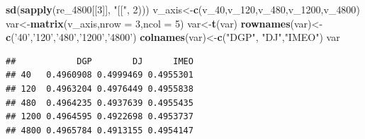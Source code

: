 \documentclass[
]{article}
\newenvironment{Shaded}{\begin{snugshade}}{\end{snugshade}}
\newcommand{\DataTypeTok}[1]{\textcolor[rgb]{0.13,0.29,0.53}{#1}}
\newcommand{\DecValTok}[1]{\textcolor[rgb]{0.00,0.00,0.81}{#1}}
\newcommand{\KeywordTok}[1]{\textcolor[rgb]{0.13,0.29,0.53}{\textbf{#1}}}
\newcommand{\NormalTok}[1]{#1}
\newcommand{\StringTok}[1]{\textcolor[rgb]{0.31,0.60,0.02}{#1}}
\begin{document}
\begin{Shaded}
\begin{Highlighting}[]
        \KeywordTok{sd}\NormalTok{(}\KeywordTok{sapply}\NormalTok{(re_}\DecValTok{4800}\NormalTok{[[}\DecValTok{3}\NormalTok{]], }\StringTok{"[["}\NormalTok{, }\DecValTok{2}\NormalTok{)))}
\NormalTok{v_axis<-}\KeywordTok{c}\NormalTok{(v_}\DecValTok{40}\NormalTok{,v_}\DecValTok{120}\NormalTok{,v_}\DecValTok{480}\NormalTok{,v_}\DecValTok{1200}\NormalTok{,v_}\DecValTok{4800}\NormalTok{)}
\NormalTok{var<-}\KeywordTok{matrix}\NormalTok{(v_axis,}\DataTypeTok{nrow =} \DecValTok{3}\NormalTok{,}\DataTypeTok{ncol =} \DecValTok{5}\NormalTok{)}
\NormalTok{var<-}\KeywordTok{t}\NormalTok{(var)}
\KeywordTok{rownames}\NormalTok{(var)<-}\KeywordTok{c}\NormalTok{(}\StringTok{'40'}\NormalTok{,}\StringTok{'120'}\NormalTok{,}\StringTok{'480'}\NormalTok{,}\StringTok{'1200'}\NormalTok{,}\StringTok{'4800'}\NormalTok{)}
\KeywordTok{colnames}\NormalTok{(var)<-}\KeywordTok{c}\NormalTok{(}\StringTok{"DGP"}\NormalTok{, }\StringTok{"DJ"}\NormalTok{,}\StringTok{"IMEO"}\NormalTok{)}
\NormalTok{var}
\end{Highlighting}
\end{Shaded}

\begin{verbatim}
##            DGP        DJ      IMEO
## 40   0.4960908 0.4999469 0.4955301
## 120  0.4963204 0.4976449 0.4955838
## 480  0.4964235 0.4937639 0.4955435
## 1200 0.4964595 0.4922698 0.4953737
## 4800 0.4965784 0.4913155 0.4954147
\end{verbatim}
\end{document}
